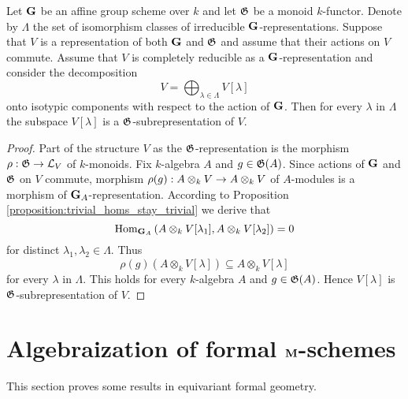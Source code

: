 \begin{corollary}\label{corollary:commuting_action_preserves_isotypic_decomposition}
Let $\mathbf{G}$ be an affine group scheme over $k$ and let ${\mathfrak G}$ be a monoid $k$-functor. Denote by $\Lambda$ the set of isomorphism classes of irreducible $\mathbf{G}$-representations. Suppose that $V$ is a representation of both $\mathbf{G}$ and ${\mathfrak G}$ and assume that their actions on $V$ commute. Assume that $V$ is completely reducible as a $\mathbf{G}$-representation and consider the decomposition
$$V = \bigoplus_{\lambda\in \Lambda}V[\lambda]$$
onto isotypic components with respect to the action of $\mathbf{G}$. Then for every $\lambda$ in $\Lambda$ the subspace $V[\lambda]$ is a ${\mathfrak G}$-subrepresentation of $V$.
\end{corollary}
\begin{proof}
Part of the structure $V$ as the ${\mathfrak G}$-representation is the morphism $\rho:{\mathfrak G} \rightarrow {\mathcal L}_V$ of $k$-monoids. Fix $k$-algebra $A$ and $g\in {\mathfrak G}(A)$. Since actions of $\mathbf{G}$ and ${\mathfrak G}$ on $V$ commute, morphism $\rho(g):A\otimes_kV\rightarrow A\otimes_kV$ of $A$-modules is a morphism of $\mathbf{G}_A$-representation. According to Proposition \ref{proposition:trivial_homs_stay_trivial} we derive that
$$\mathrm{Hom}_{\mathbf{G}_A}\left(A\otimes_kV[\lambda_1],A\otimes_kV[\lambda_2]\right) = 0$$
for distinct $\lambda_1,\lambda_2\in \Lambda$. Thus
$$\rho(g)\left(A \otimes_k V[\lambda] \right)\subseteq A \otimes_kV[\lambda]$$
for every $\lambda$ in $\Lambda$. This holds for every $k$-algebra $A$ and $g\in {\mathfrak G}(A)$. Hence $V[\lambda]$ is ${\mathfrak G}$-subrepresentation of $V$.
\end{proof}

\section{Algebraization of formal $\mathbf{M}$-schemes}
\noindent
This section proves some results in equivariant formal geometry. 

